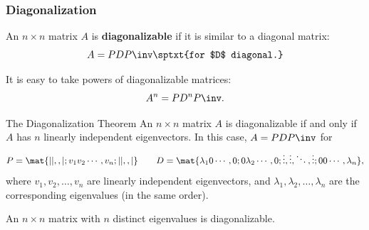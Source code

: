 
\begin{frame}
\frametitle{Diagonalization}

\vskip-3mm
\displayskips{2pt}
\begin{defn}
  An $n\times n$ matrix $A$ is \textbf{diagonalizable} if it is similar to a
  diagonal matrix:
  \[ A = PDP\inv \sptxt{for $D$ diagonal.} \]
\end{defn}

\pause
It is easy to take powers of diagonalizable matrices:
\[ A^n = PD^n P\inv. \]

\pause
\begin{oneoffthm}{The Diagonalization Theorem}
  An $n\times n$ matrix $A$ is diagonalizable if and only if $A$ has $n$
  linearly independent eigenvectors.
  In this case, $A = PDP\inv$ for
  \[ P = \mat{| |,, |; v_1 v_2 \cdots, v_n; | |,, |}
  \qquad
  D = \mat{\lambda_1 0 \cdots, 0; 0 \lambda_2 \cdots, 0;
    \vdots, \vdots, \ddots, \vdots; 0 0 \cdots, \lambda_n},
  \]
  where $v_1,v_2,\ldots,v_n$ are linearly independent eigenvectors,
  and $\lambda_1,\lambda_2,\ldots,\lambda_n$ are the corresponding eigenvalues
  (in the same order).
\end{oneoffthm}

\pause
\begin{cor}
  An $n\times n$ matrix with $n$ distinct eigenvalues is diagonalizable.
\end{cor}

\end{frame}




